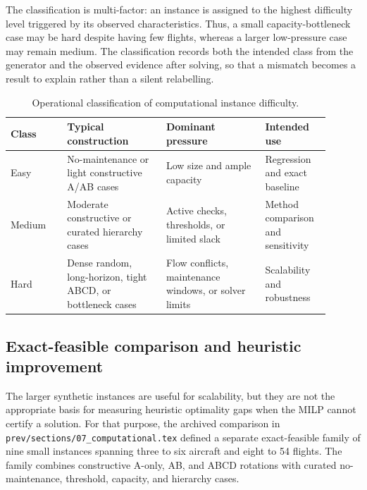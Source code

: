 The classification is multi-factor: an instance is assigned to the highest
difficulty level triggered by its observed characteristics. Thus, a small
capacity-bottleneck case may be hard despite having few flights, whereas a
larger low-pressure case may remain medium. The classification records both
the intended class from the generator and the observed evidence after solving,
so that a mismatch becomes a result to explain rather than a silent relabelling.

\begin{table}[t]
\centering\small
\caption{Operational classification of computational instance difficulty.}
\label{tab:instance_difficulty}
\begin{tabular}{p{0.16\linewidth}p{0.28\linewidth}p{0.28\linewidth}p{0.18\linewidth}}
\toprule
Class & Typical construction & Dominant pressure & Intended use \\
\midrule
Easy & No-maintenance or light constructive A/AB cases & Low size and ample capacity & Regression and exact baseline \\
Medium & Moderate constructive or curated hierarchy cases & Active checks, thresholds, or limited slack & Method comparison and sensitivity \\
Hard & Dense random, long-horizon, tight ABCD, or bottleneck cases & Flow conflicts, maintenance windows, or solver limits & Scalability and robustness \\
\bottomrule
\end{tabular}
\end{table}

\subsection{Exact-feasible comparison and heuristic improvement}
\label{subsec:computational_exact_feasible}

The larger synthetic instances are useful for scalability, but they are not
the appropriate basis for measuring heuristic optimality gaps when the MILP
cannot certify a solution. For that purpose, the archived comparison in
\texttt{prev/sections/07\_computational.tex}
defined a separate exact-feasible family of nine small instances spanning three
to six aircraft and eight to 54 flights. The family combines constructive
A-only, AB, and ABCD rotations with curated no-maintenance, threshold,
capacity, and hierarchy cases.


